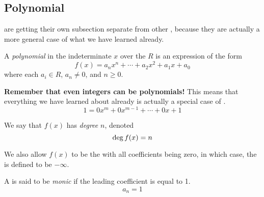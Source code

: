 \subsection{Polynomial }\label{subsec:Polynomial_Rings}
 are getting their own subsection separate from other , because they are actually a more general case of what we have learned already.
\begin{definition}[Polynomial]\label{def:Polynomial}
  A \emph{polynomial} in the indeterminate $x$ over the  $R$ is an expression of the form
  \begin{equation}\label{eq:Polynomial_Ring}
    f(x) = a_{n}x^{n} + \cdots + a_{2}x^{2} + a_{1}x + a_{0}
  \end{equation}
  where each $a_{i} \in R$, $a_{n} \neq 0$, and $n \geq 0$.

  \begin{remark}
    \textbf{Remember that even integers can be polynomials!}
    This means that everything we have learned about  already is actually a special case of .
    \begin{equation*}
      1 = 0x^{m} + 0x^{m-1} + \cdots + 0x + 1
    \end{equation*}
  \end{remark}
\end{definition}

\begin{definition}[Degree]\label{def:Polynomial_Degree}
  We say that $f(x)$ has \emph{degree} $n$, denoted
  \begin{equation}\label{eq:Polynomial_Degree}
    \operatorname{\operatorname{deg}} f(x) = n
  \end{equation}

  \begin{remark}
    We also allow $f(x)$ to be the  with all coefficients being zero, in which case, the  is defined to be $-\infty$.
  \end{remark}
\end{definition}

\begin{definition}[Monic]\label{def:Monic_Polynomial}
  A  is said to be \emph{monic} if the leading coefficient is equal to 1.
  \begin{equation}\label{eq:Monic_Polynomial}
    a_{n} = 1
  \end{equation}
\end{definition}


